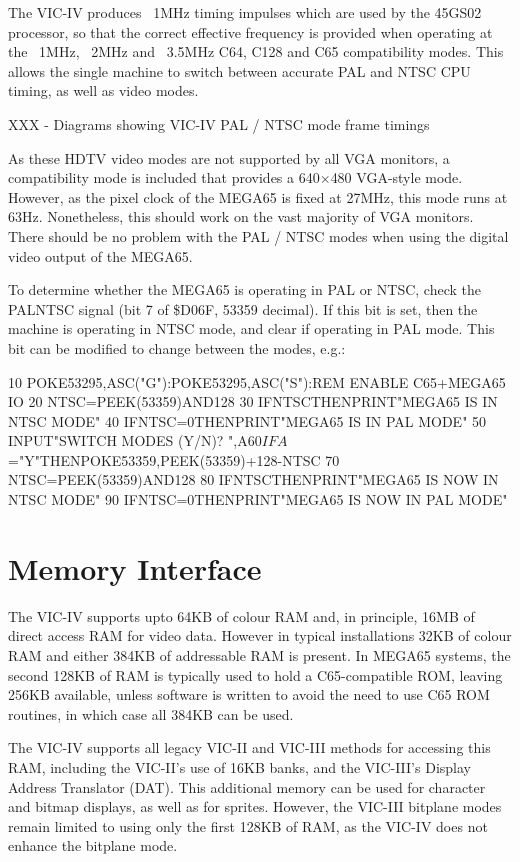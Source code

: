 The VIC-IV produces ~1MHz timing impulses which are used by the 45GS02 processor, so that the correct effective frequency is provided when operating at the ~1MHz, ~2MHz and ~3.5MHz C64, C128 and C65 compatibility modes.  This allows the single machine to switch between accurate PAL and NTSC CPU timing, as well as video modes.

XXX - Diagrams showing VIC-IV PAL / NTSC mode frame timings

As these HDTV video modes are not supported by all VGA monitors, a compatibility mode is included that provides a 640$\times$480 VGA-style mode. However, as the pixel clock of the MEGA65 is fixed at 27MHz, this mode runs at 63Hz.  Nonetheless, this should work on the vast majority of VGA monitors.  There should be no problem with the PAL / NTSC modes when using the digital video output of the MEGA65.

To determine whether the MEGA65 is operating in PAL or NTSC, check the PALNTSC signal (bit 7 of \$D06F, 53359 decimal). If this bit is set, then the machine is operating in NTSC mode, and clear if operating in PAL mode. This bit can be modified to change between the modes, e.g.:

\begin{screenoutput}
10 POKE53295,ASC("G"):POKE53295,ASC("S"):REM ENABLE C65+MEGA65 IO
20 NTSC=PEEK(53359)AND128
30 IFNTSCTHENPRINT"MEGA65 IS IN NTSC MODE"
40 IFNTSC=0THENPRINT"MEGA65 IS IN PAL MODE"
50 INPUT"SWITCH MODES (Y/N)? ",A$
60 IFA$="Y"THENPOKE53359,PEEK(53359)+128-NTSC
70 NTSC=PEEK(53359)AND128
80 IFNTSCTHENPRINT"MEGA65 IS NOW IN NTSC MODE"
90 IFNTSC=0THENPRINT"MEGA65 IS NOW IN PAL MODE"
\end{screenoutput}
  

\section{Memory Interface}

The VIC-IV supports upto 64KB of colour RAM and, in principle, 16MB of direct access RAM for video data.  However in typical installations
32KB of colour RAM and either 384KB of addressable RAM is present. In MEGA65 systems, the second 128KB of RAM is typically used to hold a C65-compatible ROM, leaving 256KB available, unless software is written to avoid the need to use C65 ROM routines, in which case all 384KB can be used.

The VIC-IV supports all legacy VIC-II and VIC-III methods for accessing this RAM, including the VIC-II's use of 16KB banks, and the VIC-III's Display Address Translator (DAT).  This additional memory can be used for character and bitmap displays, as well as for sprites.  However, the VIC-III bitplane modes remain limited to using only the first 128KB of RAM, as the VIC-IV does not enhance the bitplane mode.


